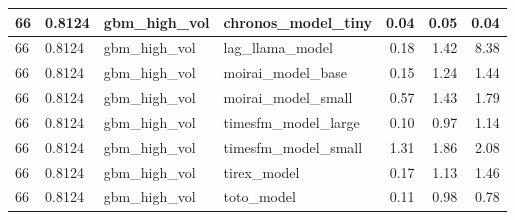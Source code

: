 {\begin{tabular}{llllrrr}
\midrule
66 & 0.8124 & gbm\_high\_vol & chronos\_model\_tiny & 0.04 & 0.05 & 0.04 \\
\midrule
66 & 0.8124 & gbm\_high\_vol & lag\_llama\_model & 0.18 & 1.42 & 8.38 \\
\midrule
66 & 0.8124 & gbm\_high\_vol & moirai\_model\_base & 0.15 & 1.24 & 1.44 \\
\midrule
66 & 0.8124 & gbm\_high\_vol & moirai\_model\_small & 0.57 & 1.43 & 1.79 \\
\midrule
66 & 0.8124 & gbm\_high\_vol & timesfm\_model\_large & 0.10 & 0.97 & 1.14 \\
\midrule
66 & 0.8124 & gbm\_high\_vol & timesfm\_model\_small & 1.31 & 1.86 & 2.08 \\
\midrule
66 & 0.8124 & gbm\_high\_vol & tirex\_model & 0.17 & 1.13 & 1.46 \\
\midrule
66 & 0.8124 & gbm\_high\_vol & toto\_model & 0.11 & 0.98 & 0.78 \\
\bottomrule
\end{tabular}
}